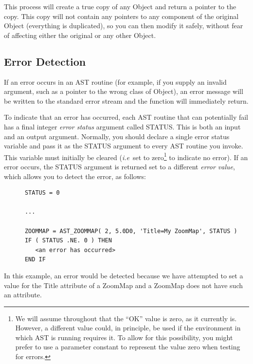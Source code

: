 \documentclass[twoside,11pt]{article}
\newcommand{\htmlref}[2]{#1}
\begin{document}
This process will create a true copy of any Object and return a
pointer to the copy. This copy will not contain any pointers to any
component of the original Object (everything is duplicated), so you
can then modify it safely, without fear of affecting either the
original or any other Object.



\subsection{\label{ss:errordetection}Error Detection}

If an error occurs in an AST routine (for example, if you supply an
invalid argument, such as a pointer to the wrong class of \htmlref{Object}{Object}), an
error message will be written to the standard error stream and the
function will immediately return.

To indicate that an error has occurred, each AST routine that can
potentially fail has a final integer {\em{error status}} argument
called STATUS.  This is both an input and an output argument.
Normally, you should declare a single error status variable and pass
it as the STATUS argument to every AST routine you invoke.  This
variable must initially be cleared ({\em{i.e}}\ set to
zero\footnote{We will assume throughout that the ``OK'' value is zero,
as it currently is. However, a different value could, in principle, be
used if the environment in which AST is running requires it. To allow
for this possibility, you might prefer to use a parameter constant to
represent the value zero when testing for errors.} to indicate no
error).  If an error occurs, the STATUS argument is returned set to a
different {\em{error value}}, which allows you to detect the error, as
follows:

\small
\begin{verbatim}
      STATUS = 0

      ...

      ZOOMMAP = AST_ZOOMMAP( 2, 5.0D0, 'Title=My ZoomMap', STATUS )
      IF ( STATUS .NE. 0 ) THEN
         <an error has occurred>
      END IF
\end{verbatim}
\normalsize

In this example, an error would be detected because we have attempted
to set a value for the \htmlref{Title}{Title} attribute of a \htmlref{ZoomMap}{ZoomMap} and a ZoomMap does
not have such an attribute.
\end{document}

